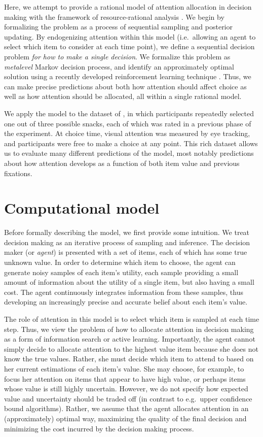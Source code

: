 \documentclass[12pt,a4paperpaper,]{article}
\begin{document}
Here, we attempt to provide a rational model of attention allocation in decision making with the framework of resource-rational analysis \citep{griffiths15}. We begin by formalizing the problem as a process of sequential sampling and posterior updating. By endogenizing attention within this model (i.e.~allowing an agent to select which item to consider at each time point), we define a sequential decision problem \emph{for how to make a single decision}. We formalize this problem as \emph{metalevel} Markov decision process, and identify an approximately optimal solution using a recently developed reinforcement learning technique \citep{callaway2018learning}. Thus, we can make precise predictions about both how attention should affect choice as well as how attention should be allocated, all within a single rational model.

We apply the model to the dataset of \citet{Krajbich2011}, in which participants repeatedly selected one out of three possible snacks, each of which was rated in a previous phase of the experiment. At choice time, visual attention was measured by eye tracking, and participants were free to make a choice at any point. This rich dataset allows us to evaluate many different predictions of the model, most notably predictions about how attention develops as a function of both item value and previous fixations.

\section{Computational model}

Before formally describing the model, we first provide some intuition. We treat decision making as an iterative process of sampling and inference. The decision maker (or \emph{agent}) is presented with a set of items, each of which has some true unknown value. In order to determine which item to choose, the agent can generate noisy samples of each item's utility, each sample providing a small amount of information about the utility of a single item, but also having a small cost. The agent continuously integrates information from these samples, thus developing an increasingly precise and accurate belief about each item's value.

The role of attention in this model is to select which item is sampled at each time step. Thus, we view the problem of how to allocate attention in decision making as a form of information search or active learning. Importantly, the agent cannot simply decide to allocate attention to the highest value item because she does not know the true values. Rather, she must decide which item to attend to based on her current estimations of each item's value. She may choose, for example, to focus her attention on items that appear to have high value, or perhaps items whose value is still highly uncertain. However, we do not specify how expected value and uncertainty should be traded off (in contrast to e.g.~upper confidence bound algorithms). Rather, we assume that the agent allocates attention in an (approximately) optimal way, maximizing the quality of the final decision and minimizing the cost incurred by the decision making process.
\end{document}
